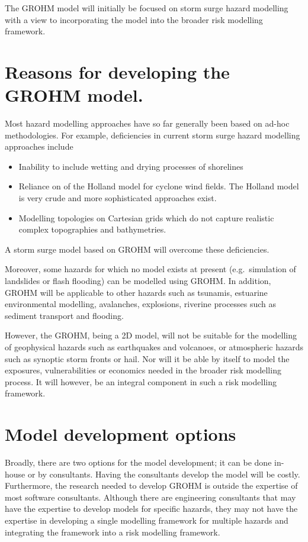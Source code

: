 \documentclass{article}
\begin{document}
The GROHM model will initially be focused on storm surge hazard
modelling with a view to incorporating the model into the broader
risk modelling framework.

\section{Reasons for developing the GROHM model.}

Most hazard modelling approaches have so far generally been based on ad-hoc
methodologies. For example, deficiencies in current storm surge hazard
modelling approaches include
\begin{itemize}
  \item Inability to include wetting and drying processes of shorelines
  \item Reliance on of the Holland model for cyclone wind fields.
  The Holland model is very crude and more sophisticated approaches exist.
  \item Modelling topologies on Cartesian grids which do not capture
  realistic complex topographies and bathymetries.
\end{itemize}
A storm surge model based on GROHM will overcome these deficiencies.

Moreover, some hazards for which no model exists at present 
(e.g.\ simulation of landslides or flash flooding) 
can be modelled using GROHM. In addition, GROHM will be
applicable to other hazards such as tsunamis, estuarine
environmental modelling, avalanches, explosions, riverine
processes such as sediment transport and flooding.

However, the GROHM, being a 2D model, will not be suitable for the
modelling of geophysical hazards such as earthquakes and
volcanoes, or atmospheric hazards such as synoptic storm fronts or
hail. Nor will it be able by itself to model the exposures,
vulnerabilities or economics needed in the broader risk modelling
process. It will however, be an integral component in such a risk
modelling framework.


\section{Model development options}
Broadly, there are two options for the model development; it can
be done in-house or by consultants.  Having the consultants
develop the model will be costly.  Furthermore, the research
needed to develop GROHM is outside the expertise of most software
consultants.  Although there are engineering consultants that may
have the expertise to develop models for specific hazards, they
may not have the expertise in developing a single modelling
framework for multiple hazards and integrating the framework into
a risk modelling framework.
\end{document}

